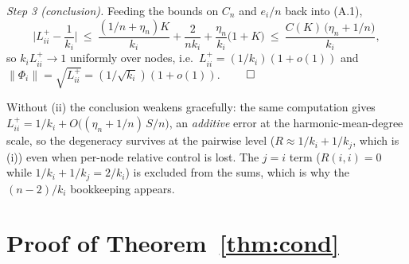 \documentclass[11pt]{article}
\theoremstyle{remark}
\begin{document}
\emph{Step 3 (conclusion).} Feeding the bounds on $C_n$ and $e_i/n$ back into
(A.1),
\[
\Big\lvert L^+_{ii}-\frac1{k_i}\Big\rvert
\ \le\ \frac{(1/n+\eta_n)K}{k_i}+\frac{2}{nk_i}
+\frac{\eta_n}{k_i}\big(1+K\big)
\ \le\ \frac{C(K)\,\big(\eta_n+1/n\big)}{k_i},
\]
so $k_iL^+_{ii}\to1$ uniformly over nodes, i.e.\
$L^+_{ii}=(1/k_i)(1+o(1))$ and $\lVert\Phi_i\rVert=\sqrt{L^+_{ii}}
=(1/\sqrt{k_i})(1+o(1))$. \hfill$\qed$

Without (ii) the conclusion weakens gracefully: the same computation gives
$L^+_{ii}=1/k_i+O\big((\eta_n+1/n)\,S/n\big)$, an \emph{additive} error at the
harmonic-mean-degree scale, so the degeneracy survives at the pairwise level
($R\approx1/k_i+1/k_j$, which is (i)) even when per-node relative control is lost.
The $j{=}i$ term ($R(i,i)=0$ while $1/k_i+1/k_j=2/k_i$) is excluded from the sums,
which is why the $(n-2)/k_i$ bookkeeping appears.


\section{Proof of Theorem~\ref{thm:cond}}\label{app:proof}
\end{document}

